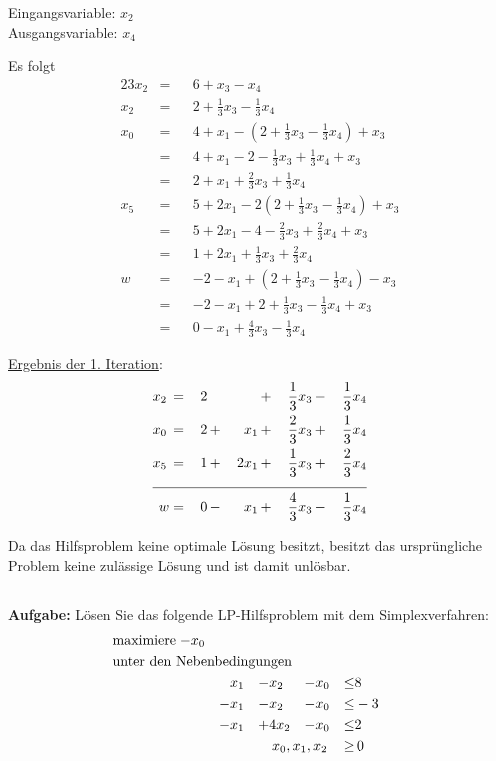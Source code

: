 \documentclass[10pt,a4paper,oneside,ngerman,numbers=noenddot]{scrartcl}
\begin{document}
		Eingangsvariable: $x_{2}$ \\
		Ausgangsvariable: $x_{4}$
		
		Es folgt
		\begin{alignat*}{2}
			3x_{2} &=&& 6 + x_{3} - x_{4} \\
			x_{2} &=&& 2 + \frac{1}{3}x_{3} - \frac{1}{3}x_{4} \\
			x_{0} &=&& 4 + x_{1} - \left(2 + \frac{1}{3}x_{3} - \frac{1}{3}x_{4}\right) + x_{3} \\
			&=&& 4 + x_{1} - 2 - \frac{1}{3}x_{3} + \frac{1}{3}x_{4} + x_{3}\\
			&=&& 2 + x_{1} + \frac{2}{3}x_{3} + \frac{1}{3}x_{4} \\
			x_{5} &=&& 5 + 2x_{1} - 2\left(2 + \frac{1}{3}x_{3} - \frac{1}{3}x_{4}\right) + x_{3} \\
			&=&& 5 + 2x_{1} - 4 - \frac{2}{3}x_{3} + \frac{2}{3}x_{4} + x_{3} \\
			&=&& 1 + 2x_{1} + \frac{1}{3}x_{3} + \frac{2}{3}x_{4} \\
			w &=&& -2 - x_{1} + \left(2 + \frac{1}{3}x_{3} - \frac{1}{3}x_{4}\right) - x_{3} \\
			&=&& -2 - x_{1} + 2 + \frac{1}{3}x_{3} - \frac{1}{3}x_{4} + x_{3} \\
			&=&& 0 - x_{1} + \frac{4}{3}x_{3} - \frac{1}{3}x_{4}
		\end{alignat*}
		
		\underline{Ergebnis der 1. Iteration}:
		\begin{alignat*}{5}
			x_{2} \,&=&\, 2 \,&& &+&\, \frac{1}{3}x_{3} \,&-&\, \frac{1}{3}x_{4}  \\
			x_{0} \,&=&\, 2 \,&+&\, x_{1} \,&+&\, \frac{2}{3}x_{3} \,&+&\, \frac{1}{3}x_{4} \\
			x_{5} \,&=&\, 1 \,&+&\, 2x_{1} \,&+&\, \frac{1}{3}x_{3} \,&+&\, \frac{2}{3}x_{4} \\ \cline{1 - 9}
			w &=& 0 \,&-&\, x_{1} \,&+&\, \frac{4}{3}x_{3} \,&-&\, \frac{1}{3}x_{4}
		\end{alignat*}
		
		Da das Hilfsproblem keine optimale Lösung besitzt, besitzt das ursprüngliche Problem keine zulässige Lösung und ist damit unlösbar.
		
	\subsection{} %
		\textbf{Aufgabe:} Lösen Sie das folgende LP-Hilfsproblem mit dem Simplexverfahren:
		\begin{alignat*}{5}
			\text{maximiere}\; -& x_{0} && && && && \\
			\multicolumn{10}{l}{\text{unter den Nebenbedingungen}} && \\
			\; & && x_{1} &-& x_{2} &-& x_{0} &\leq & 8 \\
			\; & &-& x_{1} &-& x_{2} &-& x_{0} &\leq & -3 \\
			\; & &-& x_{1} &+& 4x_{2} &-& x_{0} &\leq & 2 \\
			\multicolumn{8}{r}{$x_{0}, x_{1}, x_{2}$} \,&\geq &\, 0
		\end{alignat*}
		
\end{document}
